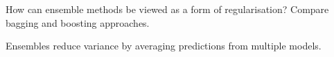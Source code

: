 \begin{exercisebox}[hard]
\begin{problem}
How can ensemble methods be viewed as a form of regularisation? Compare bagging and boosting approaches.
\end{problem}
\begin{hintbox}
Ensembles reduce variance by averaging predictions from multiple models.
\end{hintbox}
\end{exercisebox}


